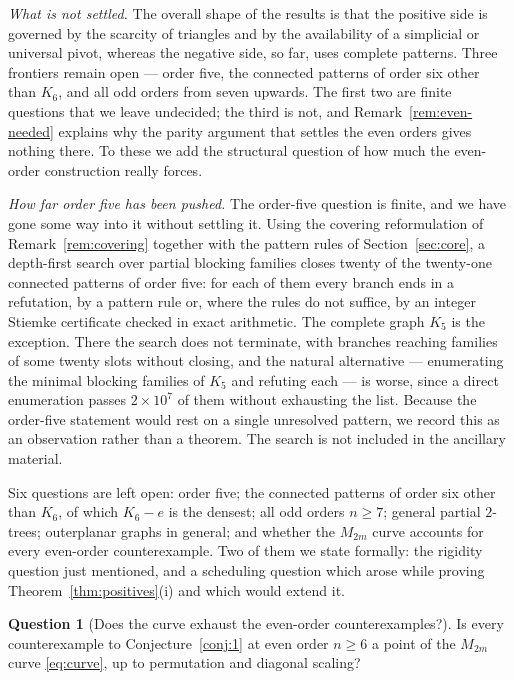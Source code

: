 \documentclass[11pt]{article}
\theoremstyle{plain}
\theoremstyle{definition}
\newtheorem{question}[theorem]{Question}
\theoremstyle{remark}
\begin{document}
\begin{humanblock}
\emph{What is not settled.} The overall shape of the results is that the positive side is governed by
the scarcity of triangles and by the availability of a simplicial or universal pivot, whereas the
negative side, so far, uses complete patterns. Three frontiers remain open --- order five, the
connected patterns of order six other than $K_6$, and all odd orders from seven upwards. The first two are finite
questions that we leave undecided; the third is not, and Remark~\ref{rem:even-needed} explains why the
parity argument that settles the even orders gives nothing there. To these we add the structural
question of how much the even-order construction really forces.

\emph{How far order five has been pushed.} The order-five question is finite, and we have gone some way into it without settling it. Using the covering reformulation of Remark~\ref{rem:covering} together with the pattern rules of Section~\ref{sec:core}, a depth-first search over partial blocking families closes twenty of the twenty-one connected patterns of order five: for each of them every branch ends in a refutation, by a pattern rule or, where the rules do not suffice, by an integer Stiemke certificate checked in exact arithmetic. The complete graph $K_5$  is the exception. There the search does not terminate, with branches reaching families of some twenty slots without closing, and the natural alternative — enumerating the minimal blocking families of $K_5$ and refuting each — is worse, since a direct enumeration passes $2\times 10^7$   of them without exhausting the list. Because the order-five statement would rest on a single unresolved pattern, we record this as an observation rather than a theorem. The search is not included in the ancillary material.

Six questions are left open: order five; the connected patterns of order six other than $K_6$, of which
$K_6-e$ is the densest; all odd orders $n\ge7$; general partial $2$-trees; outerplanar graphs in general; and whether the $M_{2m}$
curve accounts for every even-order counterexample. Two of them we state formally: the rigidity
question just mentioned, and a scheduling question which arose while proving
Theorem~\ref{thm:positives}(i) and which would extend it.

\begin{question}[Does the curve exhaust the even-order counterexamples?]\label{q:curve}
Is every counterexample to Conjecture~\ref{conj:1} at even order $n\ge6$ a point of the $M_{2m}$ curve
\eqref{eq:curve}, up to permutation and diagonal scaling?
\end{question}


\end{humanblock}
\end{document}
